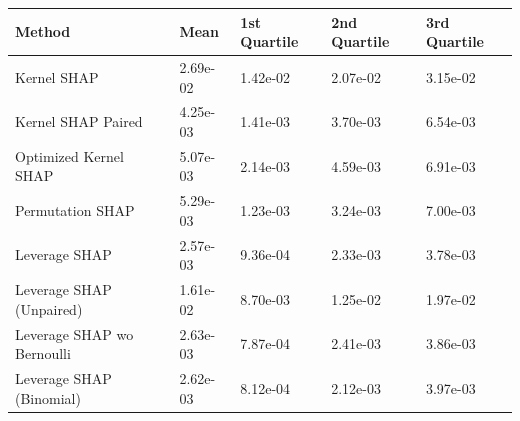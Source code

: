 \begin{tabular}{lllll}
  \toprule
  \textbf{Method} & \textbf{Mean} & \textbf{1st Quartile} & \textbf{2nd Quartile} & \textbf{3rd Quartile} \\ \midrule
Kernel SHAP & 2.69e-02 & 1.42e-02 & 2.07e-02 & 3.15e-02\\
Kernel SHAP Paired & 4.25e-03 & 1.41e-03 & 3.70e-03 & 6.54e-03\\
Optimized Kernel SHAP & 5.07e-03 & 2.14e-03 & 4.59e-03 & 6.91e-03\\
Permutation SHAP & 5.29e-03 & 1.23e-03 & 3.24e-03 & 7.00e-03\\
Leverage SHAP & \cellcolor{gold!60}2.57e-03 & \cellcolor{bronze!60}9.36e-04 & \cellcolor{silver!60}2.33e-03 & \cellcolor{gold!60}3.78e-03\\
Leverage SHAP (Unpaired) & 1.61e-02 & 8.70e-03 & 1.25e-02 & 1.97e-02\\
Leverage SHAP wo Bernoulli & \cellcolor{bronze!60}2.63e-03 & \cellcolor{gold!60}7.87e-04 & \cellcolor{bronze!60}2.41e-03 & \cellcolor{silver!60}3.86e-03\\
Leverage SHAP (Binomial) & \cellcolor{silver!60}2.62e-03 & \cellcolor{silver!60}8.12e-04 & \cellcolor{gold!60}2.12e-03 & \cellcolor{bronze!60}3.97e-03\\
\bottomrule
\end{tabular}
